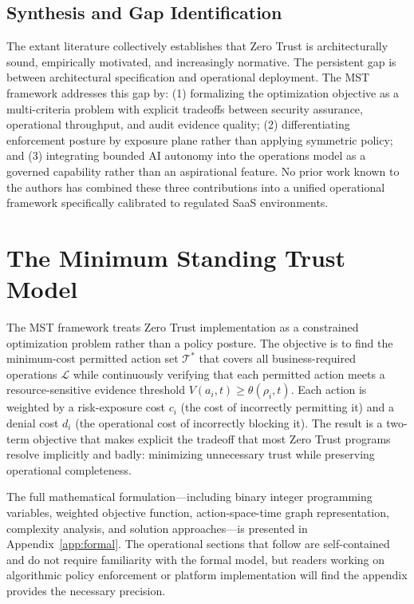 \documentclass[unnumsec,webpdf,contemporary,large]{oup-authoring-template}
\theoremstyle{thmstyleone}
\theoremstyle{thmstyletwo}
\theoremstyle{thmstylethree}
\begin{document}
\subsection{Synthesis and Gap Identification}

The extant literature collectively establishes that Zero Trust is architecturally sound,
empirically motivated, and increasingly normative. The persistent gap is between
architectural specification and operational deployment. The MST framework addresses this
gap by: (1) formalizing the optimization objective as a multi-criteria problem with
explicit tradeoffs between security assurance, operational throughput, and audit
evidence quality; (2) differentiating enforcement posture by exposure plane rather than
applying symmetric policy; and (3) integrating bounded AI autonomy into the operations
model as a governed capability rather than an aspirational feature. No prior work known
to the authors has combined these three contributions into a unified operational framework
specifically calibrated to regulated SaaS environments.

\section{The Minimum Standing Trust Model}

The MST framework treats Zero Trust implementation as a constrained optimization
problem rather than a policy posture. The objective is to find the minimum-cost
permitted action set $\mathcal{T}^{*}$ that covers all business-required operations
$\mathcal{L}$ while continuously verifying that each permitted action meets a
resource-sensitive evidence threshold $V(a_i, t) \geq \theta(\rho_i, t)$. Each
action is weighted by a risk-exposure cost $c_i$ (the cost of incorrectly permitting
it) and a denial cost $d_i$ (the operational cost of incorrectly blocking it).
The result is a two-term objective that makes explicit the tradeoff that most Zero
Trust programs resolve implicitly and badly: minimizing unnecessary trust while
preserving operational completeness.

The full mathematical formulation---including binary integer programming variables,
weighted objective function, action-space-time graph representation, complexity
analysis, and solution approaches---is presented in Appendix~\ref{app:formal}.
The operational sections that follow are self-contained and do not require
familiarity with the formal model, but readers working on algorithmic policy
enforcement or platform implementation will find the appendix provides the
necessary precision.
\end{document}
